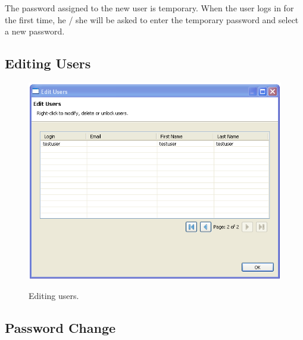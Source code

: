 The password assigned to the new user is temporary. When the user logs in for
the first time, he / she will be asked to enter the temporary password and
select a new password.

\subsection{Editing Users}
\begin{figure}[H]
  \centering
  \scalebox{0.5}
	   { \includegraphics*{screenshots/administration/edit_users} }
	   \caption{Editing users.}
	   \label{fig:edit_users}
\end{figure}

\subsection{Password Change}
